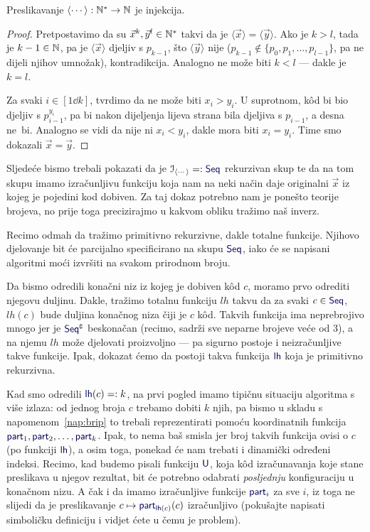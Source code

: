 \begin{propozicija}[{name=[injektivnost kodiranja konačnih nizova]}]\label{prop:codeinj}
Preslikavanje $\langle\cdots\rangle:{\mathbb N}^*\to{\mathbb N}$ je injekcija.
\end{propozicija}
\begin{proof}
    Pretpostavimo da su $\vec x^k,\vec y^{l}\in{\mathbb N}^*$ takvi da je $\langle\vec x\rangle=\langle\vec y\rangle$. Ako je $k>l$, tada je $k-1\in{\mathbb N}$, pa je $\langle\vec x\rangle$ djeljiv s $p_{k-1}$, što $\langle\vec y\rangle$ nije ($p_{k-1}\notin\{p_0,p_1,\dotsc,p_{l-1}\}$, pa ne dijeli njihov umnožak), kontradikcija. Analogno ne može biti $k<l$ --- dakle je $k=l$.
	
	Za svaki $i\in[1\dd k]$, tvrdimo da ne može biti $x_i>y_i$. U suprotnom, kôd bi bio djeljiv s $p_{i-1}^{y_i}$, pa bi nakon dijeljenja lijeva strana bila djeljiva s $p_{i-1}$, a desna ne~bi. Analogno se vidi da nije ni $x_i<y_i$, dakle mora biti $x_i=y_i$. Time smo dokazali $\vec x=\vec y$.
\end{proof}

Sljedeće bismo trebali pokazati da je $\im{\langle\cdots\rangle}=:\f{Seq}$ rekurzivan skup te da na tom skupu imamo izračunljivu funkciju koja nam na neki način daje originalni $\vec x$ iz kojeg je pojedini kod dobiven. Za taj dokaz potrebno nam je ponešto teorije brojeva, no prije toga precizirajmo u kakvom obliku tražimo naš inverz.

Recimo odmah da tražimo primitivno rekurzivne, dakle totalne funkcije. Njihovo djelovanje bit će parcijalno specificirano na skupu $\f{Seq}$, iako će se napisani algoritmi moći izvršiti na svakom prirodnom broju.

Da bismo odredili konačni niz iz kojeg je dobiven k\^od $c$, moramo prvo odrediti njegovu duljinu. Dakle, tražimo totalnu funkciju $lh$ takvu da za svaki $c\in\f{Seq}$, $lh(c)$ bude duljina konačnog niza čiji je $c$ k\^od. Takvih funkcija ima neprebrojivo mnogo jer je $\f{Seq}\kompl$ beskonačan (recimo, sadrži sve neparne brojeve veće od $3$), a na njemu $lh$ može djelovati proizvoljno --- pa sigurno postoje i neizračunljive takve funkcije. Ipak, dokazat ćemo da postoji takva funkcija $\f{lh}$ koja je primitivno rekurzivna.

Kad smo odredili $\f{lh}(c)=:k$, na prvi pogled imamo tipičnu situaciju algoritma s više izlaza: od jednog broja $c$ trebamo dobiti $k$ njih, pa bismo u skladu s napomenom~\ref{nap:brip} to trebali reprezentirati pomoću koordinatnih funkcija $\f{part}_1,\f{part}_2,\dotsc,\f{part}_k$. Ipak, to nema baš smisla jer broj takvih funkcija ovisi o $c$ (po funkciji $\f{lh}$), a osim toga, ponekad će nam trebati i dinamički određeni indeksi. Recimo, kad budemo pisali funkciju $\f U$, koja k\^od izračunavanja koje stane preslikava u njegov rezultat, bit će potrebno odabrati \emph{posljednju} konfiguraciju u konačnom nizu. A čak i da imamo izračunljive funkcije $\f{part}_i$ za sve $i$, iz toga ne slijedi da je preslikavanje $c\mapsto\f{part}_{\f{lh}(c)}(c)$ izračunljivo (pokušajte napisati simboličku definiciju i vidjet ćete u čemu je problem).

